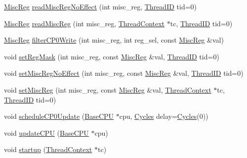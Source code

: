 \begin{DoxyCompactItemize}
\item 
\hyperlink{namespaceMipsISA_aa16539aa6584fd12f7d6fa868f75b4de}{MiscReg} \hyperlink{classMipsISA_1_1ISA_af2ec8925148a53b9bddefb7fb65a7223}{readMiscRegNoEffect} (int misc\_\-reg, \hyperlink{base_2types_8hh_ab39b1a4f9dad884694c7a74ed69e6a6b}{ThreadID} tid=0)
\item 
\hyperlink{namespaceMipsISA_aa16539aa6584fd12f7d6fa868f75b4de}{MiscReg} \hyperlink{classMipsISA_1_1ISA_a81ac5a0c0d9b625997d7737f911743b1}{readMiscReg} (int misc\_\-reg, \hyperlink{classThreadContext}{ThreadContext} $\ast$tc, \hyperlink{base_2types_8hh_ab39b1a4f9dad884694c7a74ed69e6a6b}{ThreadID} tid=0)
\item 
\hyperlink{namespaceMipsISA_aa16539aa6584fd12f7d6fa868f75b4de}{MiscReg} \hyperlink{classMipsISA_1_1ISA_aadf74b7e5f09ecd0cc35aeb0a25b4420}{filterCP0Write} (int misc\_\-reg, int reg\_\-sel, const \hyperlink{namespaceMipsISA_aa16539aa6584fd12f7d6fa868f75b4de}{MiscReg} \&val)
\item 
void \hyperlink{classMipsISA_1_1ISA_a01507af6f09e43b4f9ece624fdafb1cc}{setRegMask} (int misc\_\-reg, const \hyperlink{namespaceMipsISA_aa16539aa6584fd12f7d6fa868f75b4de}{MiscReg} \&val, \hyperlink{base_2types_8hh_ab39b1a4f9dad884694c7a74ed69e6a6b}{ThreadID} tid=0)
\item 
void \hyperlink{classMipsISA_1_1ISA_ab8dd4afdd4e652ca191b235505691f68}{setMiscRegNoEffect} (int misc\_\-reg, const \hyperlink{namespaceMipsISA_aa16539aa6584fd12f7d6fa868f75b4de}{MiscReg} \&val, \hyperlink{base_2types_8hh_ab39b1a4f9dad884694c7a74ed69e6a6b}{ThreadID} tid=0)
\item 
void \hyperlink{classMipsISA_1_1ISA_ab85b054f14d72781b7f540270867e2df}{setMiscReg} (int misc\_\-reg, const \hyperlink{namespaceMipsISA_aa16539aa6584fd12f7d6fa868f75b4de}{MiscReg} \&val, \hyperlink{classThreadContext}{ThreadContext} $\ast$tc, \hyperlink{base_2types_8hh_ab39b1a4f9dad884694c7a74ed69e6a6b}{ThreadID} tid=0)
\item 
void \hyperlink{classMipsISA_1_1ISA_a85221cc4f7fe8618574a72b6410318f4}{scheduleCP0Update} (\hyperlink{classBaseCPU}{BaseCPU} $\ast$cpu, \hyperlink{classm5_1_1params_1_1Cycles}{Cycles} delay=\hyperlink{classm5_1_1params_1_1Cycles}{Cycles}(0))
\item 
void \hyperlink{classMipsISA_1_1ISA_a872038d84b4cde793f5f2f7b75df3293}{updateCPU} (\hyperlink{classBaseCPU}{BaseCPU} $\ast$cpu)
\item 
void \hyperlink{classMipsISA_1_1ISA_a769e733729615c529fdb54f538f11dba}{startup} (\hyperlink{classThreadContext}{ThreadContext} $\ast$tc)

\end{DoxyCompactItemize}
